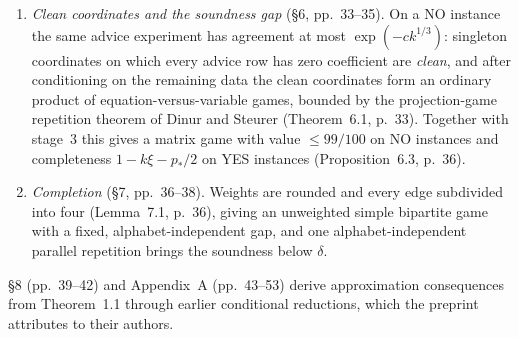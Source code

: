 \documentclass[11pt]{article}
\newcommand{\ploc}[2]{#1}
\begin{document}
\begin{enumerate}
  rank-one perturbation agrees with an affine evaluation $M\mapsto Mz+u$ on a
  \emph{slice} cut out by at most $r_{\rm s}$ row and $r_{\rm s}$ column
  equations. A spectral comparison (\ploc{Lemma~5.4, p.~25}{04-matrix.tex:244--252})
  turns acceptance of the latent test into acceptance of the uniform rank-one
  test in $K$. The \emph{advice experiment}
  (\ploc{Definition~5.2, p.~23}{04-matrix.tex:168--187}) sends both provers a
  uniform map $A:K\to\mathbb F_2^{r_{\rm s}}$ and the rows $AM$ of the $K$-component of
  a table on $O$, pulled back to $U$; an erasure argument and a comparison of
  the pulled-back table law with the unrestricted law (with $\beta=k^{-2/3}$)
  transfer the slice from $U$ to $O$, and a Fourier decoder on the $O$-prover's
  row fiber yields answer agreement with probability at least a fixed
  $\gamma>0$, independently of $k$.
\item \emph{Clean coordinates and the soundness gap} (\ploc{\S6, pp.~33--35}{05-clean.tex:1--282}).
  On a NO instance the same advice experiment has agreement at most
  $\exp(-ck^{1/3})$: singleton coordinates on which every advice row has zero
  coefficient are \emph{clean}, and after conditioning on the remaining data
  the clean coordinates form an ordinary product of equation-versus-variable
  games, bounded by the projection-game repetition theorem of Dinur and
  Steurer (\ploc{Theorem~6.1, p.~33}{05-clean.tex:26--42}). Together with
  stage~3 this gives a matrix game with value $\le 99/100$ on NO instances and
  completeness $1-k\xi-p_*/2$ on YES instances
  (\ploc{Proposition~6.3, p.~36}{05-clean.tex:243--256}).
\item \emph{Completion} (\ploc{\S7, pp.~36--38}{06-finish.tex:1--241}).
  Weights are rounded and every edge subdivided into four
  (\ploc{Lemma~7.1, p.~36}{06-finish.tex:17--30}), giving an unweighted simple
  bipartite game with a fixed, alphabet-independent gap, and one alphabet-independent
  parallel repetition brings the soundness below $\delta$.
\end{enumerate}
\ploc{\S8 (pp.~39--42)}{07-consequences.tex:1--331} and
\ploc{Appendix~A (pp.~43--53)}{finite-consequences.tex:1--988} derive
approximation consequences from Theorem~1.1 through earlier conditional
reductions, which the preprint attributes to their authors.
\end{document}
